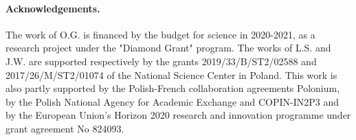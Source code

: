 \documentclass[aps,prd,superscriptaddress,floatfix,showpacs]{revtex4}
\begin{document}
\paragraph*{Acknowledgements.}
\noindent
The work of O.G. is financed by the budget for science in 2020-2021, as a research project under the "Diamond Grant" program.
 The works of L.S. and J.W. are  supported respectively by the grants 2019/33/B/ST2/02588 and 2017/26/M/ST2/01074 of the National Science Center in Poland.  
This work is also partly supported by the Polish-French collaboration agreements Polonium, by the Polish National Agency for Academic Exchange and COPIN-IN2P3 and by the European Union’s Horizon 2020 research and innovation programme under grant agreement No 824093.
%

%
\end{document}

